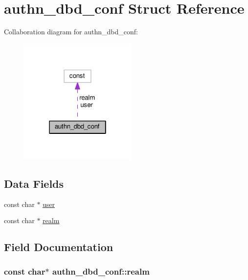 \hypertarget{structauthn__dbd__conf}{}\section{authn\+\_\+dbd\+\_\+conf Struct Reference}
\label{structauthn__dbd__conf}


Collaboration diagram for authn\+\_\+dbd\+\_\+conf\+:
\nopagebreak
\begin{figure}[H]
\begin{center}
\leavevmode
\includegraphics[width=166pt]{structauthn__dbd__conf__coll__graph}
\end{center}
\end{figure}
\subsection*{Data Fields}
\begin{DoxyCompactItemize}
\item 
const char $\ast$ \hyperlink{structauthn__dbd__conf_a7cb98cf1226529c727005588954b1273}{user}
\item 
const char $\ast$ \hyperlink{structauthn__dbd__conf_a7a2c4acf2e192d475873194a0bf572fc}{realm}
\end{DoxyCompactItemize}


\subsection{Field Documentation}
\subsubsection[{\texorpdfstring{realm}{realm}}]{\setlength{\rightskip}{0pt plus 5cm}const char$\ast$ authn\+\_\+dbd\+\_\+conf\+::realm}\hypertarget{structauthn__dbd__conf_a7a2c4acf2e192d475873194a0bf572fc}{}\label{structauthn__dbd__conf_a7a2c4acf2e192d475873194a0bf572fc}

